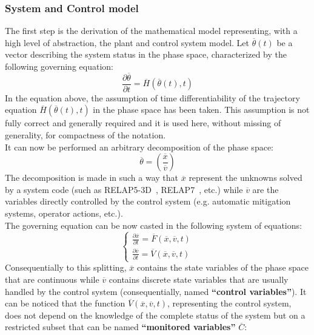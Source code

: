\subsubsection{System and Control model}
\label{subsub:controlAndSystem}
The first step is the derivation of the mathematical model representing, with a high 
level of abstraction, the plant and control system model. Let $\overline{\theta}\left ( t 
\right )$ be a vector describing the system status in the phase space, characterized 
by the following governing equation:
\begin{equation}
\label{eq:dThetaOverDT}
\frac{\partial \overline{\theta} }{\partial t}=\overline{H}\left (  \overline{\theta}\left ( t \right ),t \right )
\end{equation}
In the equation above, the assumption of time differentiability of the trajectory equation $\overline{H}\left (  \overline{\theta}\left ( t \right ),t \right )$ in the phase space has been taken. This assumption is not fully correct and generally required and it is used here, without missing of generality, for compactness of the notation.
\\It can now be performed an arbitrary decomposition of the phase space:
\begin{equation}
\label{eq:thetaDecomposition}
  \overline{\theta} = \left (\frac{\overline{x}}{\overline{v}}  \right )
\end{equation}
The decomposition is made in such a way that $\overline{x}$ represent the unknowns 
solved by a system code (such as RELAP5-3D~\cite{relap5}, 
RELAP7~\cite{relap7FY12}, etc.) while $\overline{v}$ are the variables directly 
controlled by the control system (e.g. automatic mitigation systems, operator actions, 
etc.).
\\The governing equation can be now casted in the following system of equations:
\begin{equation}
\label{eq:governingEquations}
\left\{\begin{matrix}
\frac{\partial \overline{x} }{\partial t} = \overline{F}\left (  \overline{x}, \overline{v}, t \right )  \\ 
\frac{\partial \overline{v} }{\partial t} = \overline{V}\left (  \overline{x}, \overline{v}, t \right )
\end{matrix}\right.
\end{equation}
Consequentially to this splitting, $\overline{x}$ contains the state variables of the 
phase space that are continuous while $\overline{v}$ contains discrete state 
variables that are usually handled by the control system (consequentially, named 
\textbf{``control variables''}). It can be noticed that the
function  $ \overline{V}\left (  \overline{x}, \overline{v}, t \right )$, representing the 
control system, does not depend on the  knowledge of the complete status of the 
system but on a restricted subset that can be named \textbf{``monitored variables''} $\overline{C}$:

